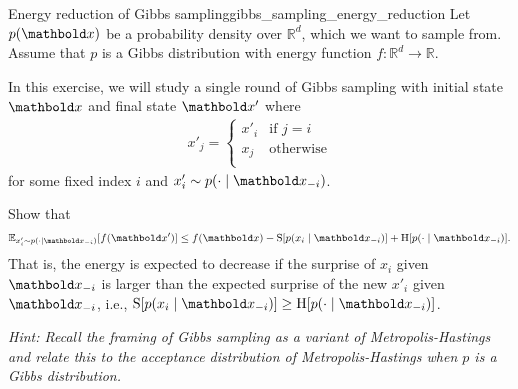 \begin{nexercise}{Energy reduction of Gibbs sampling}{gibbs_sampling_energy_reduction}
  Let $p(\vx)$ be a probability density over $\mathbb{R}^d$, which we want to sample from.
  Assume that $p$ is a Gibbs distribution with energy function $f : \mathbb{R}^d \to \mathbb{R}$.

  In this exercise, we will study a single round of Gibbs sampling with initial state $\vx$ and final state $\vxp$ where \begin{align*}
    x'_j = \begin{cases}
      x'_i & \text{if $j = i$} \\
      x_j & \text{otherwise} \\
    \end{cases}
  \end{align*} for some fixed index $i$ and $x'_i \sim p(\cdot \mid \vx_{-i})$.

  Show that \begin{align}
    \E[x'_i \sim p(\cdot \mid \vx_{-i})]{f(\vxp)} \leq f(\vx) - \S{p(x_i \mid \vx_{-i})} + \H{p(\cdot \mid \vx_{-i})}.
  \end{align}
  That is, the energy is expected to decrease if the surprise of $x_i$ given $\vx_{-i}$ is larger than the expected surprise of the new $x'_i$ given~$\vx_{-i}$, i.e., $\S{p(x_i \mid \vx_{-i})} \geq \H{p(\cdot \mid \vx_{-i})}$.

  \textit{Hint: Recall the framing of Gibbs sampling as a variant of Metropolis-Hastings and relate this to the acceptance distribution of Metropolis-Hastings when $p$ is a Gibbs distribution.}
\end{nexercise}

